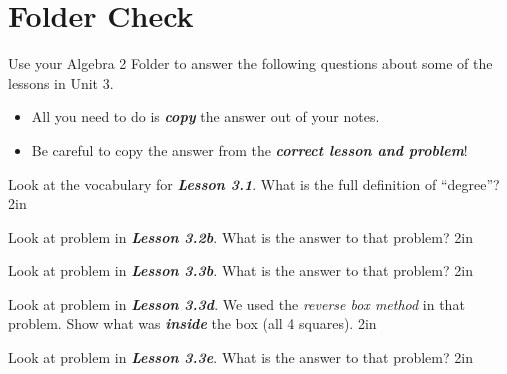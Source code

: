 \chapter*{Folder Check}

Use your Algebra 2 Folder to answer the following questions about some of the lessons in Unit 3.
\begin{itemize}[nosep,fullwidth]
    \item All you need to do is {\bfseries\itshape copy} the answer out of your notes.
    \item Be careful to copy the answer from the {\bfseries\itshape correct lesson and problem}!
\end{itemize}

\myWideProblem
    {
        Look at the vocabulary for {\bfseries\itshape Lesson 3.1}.
        What is the full definition of ``degree''?
    }
    {2in}

    \myWideProblem
    {
        Look at problem  in {\bfseries\itshape Lesson 3.2b}.
        What is the answer to that problem?
    }
    {2in}

    \myWideProblem
    {
        Look at problem  in {\bfseries\itshape Lesson 3.3b}.
        What is the answer to that problem?
    }
    {2in}

    \myWideProblem
    {
        Look at problem  in {\bfseries\itshape Lesson 3.3d}.
        We used the {\itshape reverse box method} in that problem.
        Show what was {\bfseries\itshape inside} the box (all 4 squares).
    }
    {2in}

    \myWideProblem
    {
        Look at problem  in {\bfseries\itshape Lesson 3.3e}.
        What is the answer to that problem?
    }
    {2in}

